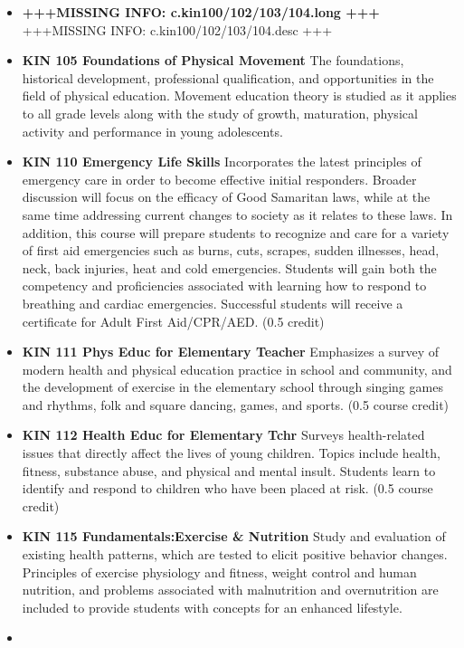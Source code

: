 \documentclass[
  letterpaper,
]{scrbook}
\providecommand{\tightlist}{%
  \setlength{\itemsep}{0pt}\setlength{\parskip}{0pt}}
\begin{document}
\begin{itemize}
\tightlist
\item
  \textbf{+++MISSING INFO: c.kin100/102/103/104.long +++} +++MISSING
  INFO: c.kin100/102/103/104.desc +++
\item
  \textbf{KIN 105 Foundations of Physical Movement} The foundations,
  historical development, professional qualification, and opportunities
  in the field of physical education. Movement education theory is
  studied as it applies to all grade levels along with the study of
  growth, maturation, physical activity and performance in young
  adolescents.
\item
  \textbf{KIN 110 Emergency Life Skills} Incorporates the latest
  principles of emergency care in order to become effective initial
  responders. Broader discussion will focus on the efficacy of Good
  Samaritan laws, while at the same time addressing current changes to
  society as it relates to these laws. In addition, this course will
  prepare students to recognize and care for a variety of first aid
  emergencies such as burns, cuts, scrapes, sudden illnesses, head,
  neck, back injuries, heat and cold emergencies. Students will gain
  both the competency and proficiencies associated with learning how to
  respond to breathing and cardiac emergencies. Successful students will
  receive a certificate for Adult First Aid/CPR/AED. (0.5 credit)
\item
  \textbf{KIN 111 Phys Educ for Elementary Teacher} Emphasizes a survey
  of modern health and physical education practice in school and
  community, and the development of exercise in the elementary school
  through singing games and rhythms, folk and square dancing, games, and
  sports. (0.5 course credit)
\item
  \textbf{KIN 112 Health Educ for Elementary Tchr} Surveys
  health-related issues that directly affect the lives of young
  children. Topics include health, fitness, substance abuse, and
  physical and mental insult. Students learn to identify and respond to
  children who have been placed at risk. (0.5 course credit)
\item
  \textbf{KIN 115 Fundamentals:Exercise \& Nutrition} Study and
  evaluation of existing health patterns, which are tested to elicit
  positive behavior changes. Principles of exercise physiology and
  fitness, weight control and human nutrition, and problems associated
  with malnutrition and overnutrition are included to provide students
  with concepts for an enhanced lifestyle.
\item

\end{itemize}
\end{document}
